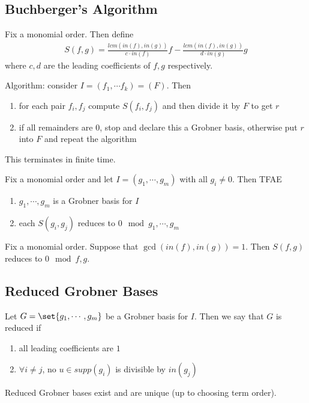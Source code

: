 \subsection{Buchberger's Algorithm}

\begin{definition}
Fix a monomial order. Then define
\begin{align*}
    S(f,g) = \frac{lcm ( in (f) , in(g) )}{c \cdot in (f)} f - \frac{lcm ( in (f) , in(g) )}{d \cdot in (g)} g 
\end{align*}
where $c,d$ are the leading coefficients of $f,g$ respectively.
\end{definition}

Algorithm: consider $I = (f_1, \cdots f_k) = (F)$. Then
\begin{enumerate}
    \item for each pair $f_i , f_j$ compute $S(f_i , f_j)$ and then divide it by $F$ to get $r$
    \item if all remainders are $0$, stop and declare this a Grobner basis, otherwise put $r$ into $F$ and repeat the algorithm
\end{enumerate}

This terminates in finite time.

\begin{theorem}
Fix a monomial order and let $I = (g_1, \cdots , g_m) $ with all $g_i \neq 0$. Then TFAE
\begin{enumerate}
    \item $g_1, \cdots , g_m $ is a Grobner basis for $I$
    \item each $S(g_i, g_j) $ reduces to $0 \mod  g_1, \cdots , g_m$
\end{enumerate}
\end{theorem}

\begin{lemma}
Fix a monomial order. Suppose that $\gcd (in(f) , in(g) ) = 1$. Then $S(f,g) $ reduces to $0 \mod f,g$.
\end{lemma}

\subsection{Reduced Grobner Bases}

\begin{definition}
Let $G = \set{g_1, \cdots , g_m}$ be a Grobner basis for $I$. Then we say that $G$ is reduced if
\begin{enumerate}
    \item all leading coefficients are $1$
    \item $\forall i \neq j $, no $u \in supp (g_i)$ is divisible by $in (g_j)$
\end{enumerate}
\end{definition}

\begin{theorem}
Reduced Grobner bases exist and are unique (up to choosing term order).
\end{theorem}